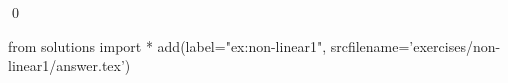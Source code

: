 
\begin{ex} 
  \label{ex:non-linear1}
  
  \qed
\end{ex} 
\begin{python0}
from solutions import *
add(label="ex:non-linear1",
    srcfilename='exercises/non-linear1/answer.tex') 
\end{python0}
